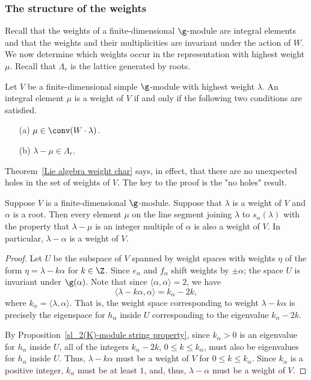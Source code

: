 \subsubsection{The structure of the weights}
Recall that the weights of a finite-dimensional $\g$-module are integral elements and that the weights and their multiplicities are invariant under the action of $W$. We now determine which weights occur in the representation with highest weight $\mu$. Recall that $\Lambda_r$ is the lattice generated by roots.
\begin{theorem}\label{Lie algebra weight char}
Let $V$ be a finite-dimensional simple $\g$-module with highest weight $\lambda$. An integral element $\mu$ is a weight of $V$ if and only if the following two conditions are satisfied.
\begin{itemize}
\item[(a)] $\mu\in\conv(W\cdot\lambda)$.
\item[(b)] $\lambda-\mu\in\Lambda_r$.
\end{itemize}
\end{theorem}
Theorem~\ref{Lie algebra weight char} says, in effect, that there are no unexpected holes in the set of weights of $V$. The key to the proof is the "no holes" result.
\begin{lemma}\label{Lie algebra no holes lemma}
Suppose $V$ is a finite-dimensional $\g$-module. Suppose that $\lambda$ is a weight of $V$ and $\alpha$ is a root. Then every element $\mu$ on the line segment joining $\lambda$ to $s_\alpha(\lambda)$ with the property that $\lambda-\mu$ is an integer multiple of $\alpha$ is also a weight of $V$. In particular, $\lambda-\alpha$ is a weight of $V$.
\end{lemma}
\begin{proof}
Let $U$ be the subspace of $V$ spanned by weight spaces with weights $\eta$ of the form $\eta=\lambda-k\alpha$ for $k\in\Z$. Since $e_\alpha$ and $f_\alpha$ shift weights by $\pm\alpha$; the space $U$ is invariant under $\g(\alpha)$. Note that since $\langle\alpha,\alpha\rangle=2$, we have
\[\langle\lambda-k\alpha,\alpha\rangle=k_\alpha-2k,\]
where $k_\alpha=\langle\lambda,\alpha\rangle$. That is, the weight space corresponding to weight $\lambda-k\alpha$ is precisely the eigenspace for $h_\alpha$ inside $U$ corresponding to the eigenvalue $k_\alpha-2k$.\par
By Proposition~\ref{sl_2(K)-module string property}, since $k_\alpha>0$ is an eigenvalue for $h_\alpha$ inside $U$, all of the integers $k_\alpha-2k$, $0\leq k\leq k_\alpha$, must also be eigenvalues for $h_\alpha$ inside $U$. Thus, $\lambda-k\alpha$ must be a weight of $V$ for $0\leq k\leq k_\alpha$. Since $k_\alpha$ is a positive integer, $k_\alpha$ must be at least $1$, and, thus, $\lambda-\alpha$ must be a weight of $V$.
\end{proof}
